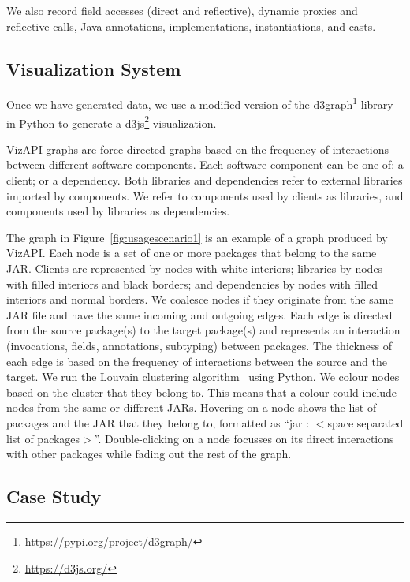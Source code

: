 We also record field accesses (direct and reflective), dynamic proxies
and reflective calls, Java annotations, implementations,
instantiations, and casts.

\subsection{Visualization System}
\label{subsec:vis-system}

Once we have generated data, we use a modified version
of the d3graph\footnote{\url{https://pypi.org/project/d3graph/}} library in Python to generate a d3js\footnote{\url{https://d3js.org/}}
visualization. 

VizAPI graphs are force-directed graphs based on the
frequency of interactions between different software components. 
Each software component can be one of: a client; or a dependency.
Both libraries and dependencies refer to external libraries imported by components.
We refer to components used by clients as libraries, and components used by libraries
as dependencies. 

The graph in Figure~\ref{fig:usagescenario1}
is an example of a graph produced by VizAPI.
Each node is a set of one or more packages that belong to the same JAR. 
Clients are represented by nodes with white interiors; libraries by nodes with filled interiors and black borders;
and dependencies by nodes with filled interiors and normal borders.
We coalesce nodes if they originate from the same 
JAR file and have the same incoming and outgoing edges. Each edge is directed 
from the source package(s) to the target package(s) and represents an interaction 
(invocations, fields, annotations, subtyping) between packages. 
The thickness of each edge is based on the frequency of interactions between the source and the target.
We run the Louvain clustering algorithm~\cite{blondel2008fast} using Python. 
We colour nodes based on the cluster that they belong to. 
This means that a colour could include nodes from the same or different JARs.
Hovering on a node shows the list of packages and 
the JAR that they belong to, 
formatted as “jar : $<$space separated list of packages$>$”. 
Double-clicking on a node focusses on its direct interactions with other packages while fading out the rest of the graph.

\subsection{Case Study}
\label{subsec:evaluation}

